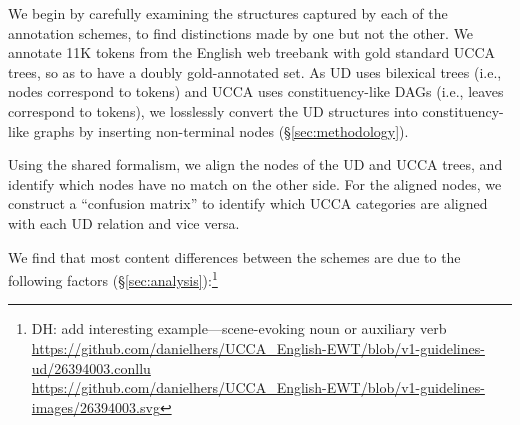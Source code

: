 \documentclass[11pt,a4paper]{article}
\newcommand{\daniel}[1]{\footnote{\color{blue}DH: #1}}
\begin{document}

  

  We begin by carefully examining the structures captured by each of the annotation schemes, to find distinctions made by one but not the other. 
  We annotate 11K tokens from the English web treebank with gold standard UCCA trees, so as to have a doubly gold-annotated set.
  As UD uses bilexical trees (i.e., nodes correspond to tokens) and UCCA uses constituency-like DAGs (i.e., leaves correspond to tokens), 
  we losslessly convert the UD structures into constituency-like graphs by inserting non-terminal nodes (\S\ref{sec:methodology}). 
  
  Using the shared formalism, we align the nodes of the UD and UCCA trees, and identify which nodes have no match on the other side. 
  For the aligned nodes, we construct a ``confusion matrix'' to identify which UCCA categories are aligned with each UD relation and vice versa. 
  
  
   We find that most content differences between the schemes are due to the following
   factors (\S\ref{sec:analysis}):\daniel{add interesting example---scene-evoking noun or auxiliary verb
   \\\url{https://github.com/danielhers/UCCA_English-EWT/blob/v1-guidelines-ud/26394003.conllu} \\\url{https://github.com/danielhers/UCCA_English-EWT/blob/v1-guidelines-images/26394003.svg}}
\end{document}
